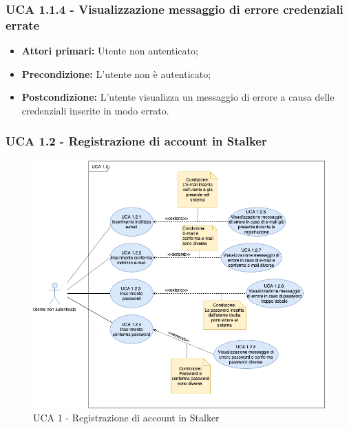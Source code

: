 \subsubsection{UCA 1.1.4 - Visualizzazione messaggio di errore credenziali errate}%
\begin{itemize}
\item \textbf{Attori primari:} Utente non autenticato;
\item \textbf{Precondizione:}  L'utente non è autenticato;
\item \textbf{Postcondizione:} L'utente visualizza un messaggio di errore a causa delle credenziali inserite in modo errato.
\end{itemize}

\subsubsection{UCA 1.2 - Registrazione di account in Stalker}%

\begin{figure}[h]
  \centering
    \includegraphics[scale=0.5]{sezioni/UseCase/Immagini/Registrazione.png}
  \caption{UCA 1 -  Registrazione di account in Stalker}
\end{figure}

